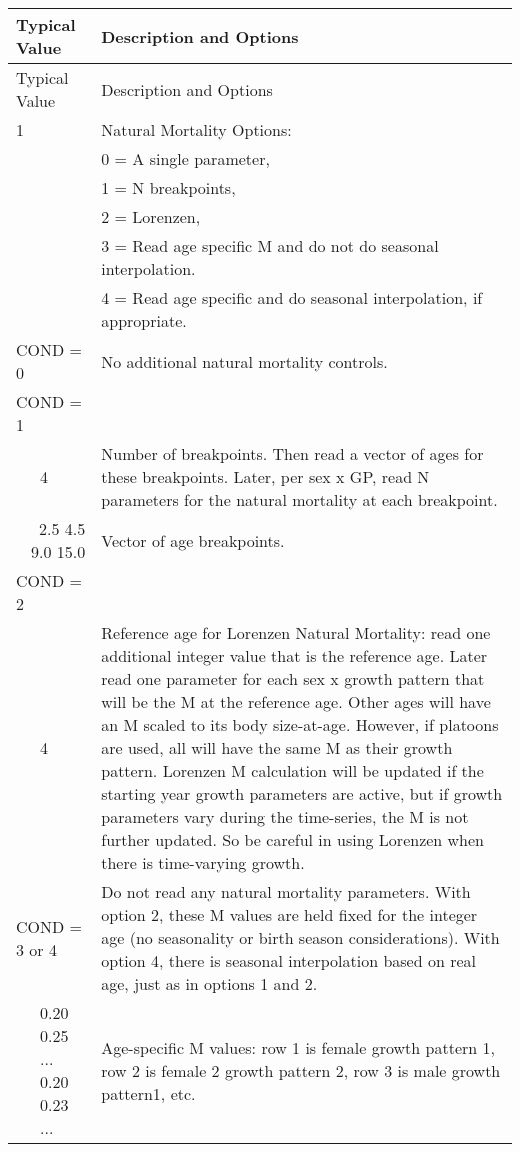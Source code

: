 \begin{longtable}{p{0.5cm} p{2cm} p{12.75cm}}
	\hline	
	\multicolumn{2}{l}{Typical Value} & Description and Options\Tstrut\Bstrut\\
	\hline
	\endfirsthead

	\hline
	\multicolumn{2}{l}{Typical Value} & Description and Options\Tstrut\Bstrut\\
	\hline
	\endhead
	\hline

	\endfoot
	
	\endlastfoot

	1 & & Natural Mortality Options:\Tstrut\\
	  & & 0 = A single parameter,\\
	  & & 1 = N breakpoints,\\
	  & & 2 = Lorenzen, \\
	  & & 3 = Read age specific M and do not do seasonal interpolation.\\
	  & & 4 = Read age specific and do seasonal interpolation, if appropriate.\Bstrut\\
	\hline

	\multicolumn{2}{l}{COND = 0} & No additional natural mortality controls. \Tstrut\Bstrut\\
	\hline

	\multicolumn{2}{l}{COND = 1} & \Tstrut\Bstrut\\
	& 4 & Number of breakpoints.  Then read a vector of ages for these breakpoints. Later, per sex x GP, read N parameters for the natural mortality at each breakpoint.\\

	\multicolumn{2}{r}{2.5 4.5 9.0 15.0} & Vector of age breakpoints. \Bstrut\\
	\hline
	
	\multicolumn{2}{l}{COND = 2} & \Tstrut\\
	& 4 \Tstrut & Reference age for Lorenzen Natural Mortality: read one additional integer value that is the reference age. Later read one parameter for each sex x growth pattern that will be the M at the reference age.  Other ages will have an M scaled to its body size-at-age.  However, if platoons are used, all will have the same M as their growth pattern.  Lorenzen M calculation will be updated if the starting year growth parameters are active, but if growth parameters vary during the time-series, the M is not further updated.  So be careful in using Lorenzen when there is time-varying growth.\\
	\hline
	
	\multicolumn{2}{l}{COND = 3 or 4} \Tstrut & Do not read any natural mortality parameters.  With option 2, these M values are held fixed for the integer age (no seasonality or birth season considerations). With option 4, there is seasonal interpolation based on real age, just as in options 1 and 2.\\

	& 0.20 0.25 ... 0.20 0.23 ... & Age-specific M values: row 1 is female growth pattern 1, row 2 is female 2 growth pattern 2, row 3 is male growth pattern1, etc.\Bstrut\\
	\hline
\end{longtable}

